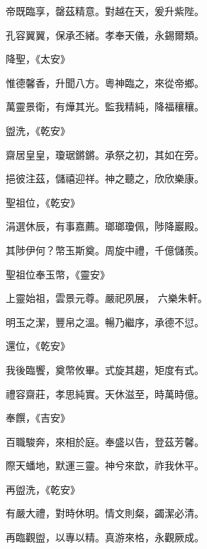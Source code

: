 \begin{pinyinscope}
 帝既臨享，罄茲精意。對越在天，爰升紫陛。



 孔容翼翼，保承丕緒。孝奉天儀，永錫爾類。



 降聖，《太安》



 惟德馨香，升聞八方。粵神臨之，來從帝鄉。



 萬靈景衛，有燁其光。監我精純，降福穰穰。



 盥洗，《乾安》



 齋居皇皇，瓊琚鏘鏘。承祭之初，其如在旁。



 挹彼注茲，儲禧迎祥。神之聽之，欣欣樂康。



 聖祖位，《乾安》



 涓選休辰，有事嘉薦。瑯瑯瓊佩，陟降巖殿。



 其陟伊何？幣玉斯奠。周旋中禮，千億儲羨。



 聖祖位奉玉幣，《靈安》



 上靈始祖，雲景元尊。嚴祀夙展，
 六樂朱軒。



 明玉之潔，豐帛之溫。暢乃繼序，承德不愆。



 還位，《乾安》



 我後臨饗，奠幣攸畢。式旋其趨，矩度有式。



 禮容齋莊，孝思純實。天休滋至，時萬時億。



 奉饌，《吉安》



 百職駿奔，來相於庭。奉盛以告，登茲芳馨。



 際天蟠地，默運三靈。神兮來歆，祚我休平。



 再盥洗，《乾安》



 有嚴大禮，對時休明。情文則粲，蠲潔必清。



 再臨觀盥，以專以精。真游來格，永觀厥成。




\end{pinyinscope}
